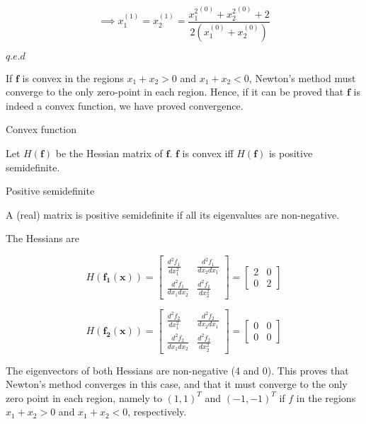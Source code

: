 \documentclass[00-main.tex]{subfiles}
\begin{document}
\begin{equation}
\implies
x_1^{(1)} = x_2^{(1)}
=
\frac{{x_1^{2}}^{(0)} + {x_2^2}^{(0)} + 2 }{2(x_1^{(0)} + x_2^{(0)})} 
\end{equation}
\label{2a}

$q.e.d$

If $\mathbf{f}$ is convex in the regions $x_1+x_2>0$ and $x_1+x_2<0$, Newton's method must converge to the only zero-point in each region. 
Hence, if it can be proved that $\mathbf{f}$ is indeed a convex function, we have proved convergence.

\begin{listing}
\caption*{Convex function}
Let $H(\mathbf{f})$ be the Hessian matrix of $\mathbf{f}$. $\mathbf{f}$ is convex iff $H(\mathbf{f})$ is positive semidefinite.
\end{listing}

\begin{listing}
\caption*{Positive semidefinite}
A (real) matrix is  positive  semidefinite if all its eigenvalues are non-negative.
\end{listing}

The Hessians are

\begin{equation}
H(\mathbf{f_1}(\mathbf{x}))
=
\left[ 	
	\begin{array}{cc} 
		\frac{d^2 f_1}{dx_1^2} & \frac{d^2 f_1}{dx_2dx_1} \\ 
		\frac{d^2 f_1}{dx_1dx_2} & \frac{d^2f_1}{dx_2^2}  
	\end{array} 
\right]
=
\left[ 	
	\begin{array}{cc} 
		2 & 0 \\ 
		0 & 2  
	\end{array} 
\right] 
\end{equation}

\begin{equation}
H(\mathbf{f_2}(\mathbf{x}))
=
\left[ 	
	\begin{array}{cc} 
		\frac{d^2 f_2}{dx_1^2} & \frac{d^2 f_2}{dx_2dx_1} \\ 
		\frac{d^2 f_2}{dx_1dx_2} & \frac{d^2f_2}{dx_2^2}  
	\end{array} 
\right]
=
\left[ 	
	\begin{array}{cc} 
		0 & 0 \\ 
		0 & 0  
	\end{array} 
\right] 
\end{equation}


The eigenvectors of both Hessians are non-negative (4 and 0). This proves that Newton's method converges in this case, and that it must converge to the only zero point in each region, namely to $(1,1)^T$ and $(-1,-1)^T$ if $f$ in the regions $x_1+x_2>0$ and $x_1+x_2<0$, respectively. 
\end{document}
